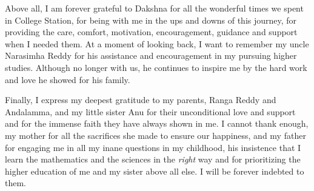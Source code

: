 Above all, I am forever grateful to Dakshna for all the wonderful times we spent in College Station, for being with me in the ups and downs of this journey, for providing the care, comfort, motivation, encouragement, guidance and support when I needed them. At a moment of looking back, I want to remember my uncle Narasimha Reddy for his assistance and encouragement in my pursuing higher studies. Although no longer with us, he continues to inspire me by the hard work and love he showed for his family.

Finally, I express my deepest gratitude to my parents, Ranga Reddy and Andalamma, and my little sister Anu for their unconditional love and support and for the immense faith they have always shown in me. I cannot thank enough, my mother for all the sacrifices she made to ensure our happiness, and my father for engaging me in all my inane questions in my childhood, his insistence that I learn the mathematics and the sciences in the \textit{right} way and for prioritizing the higher education of me and my sister above all else. I will be forever indebted to them.
\pagebreak{}